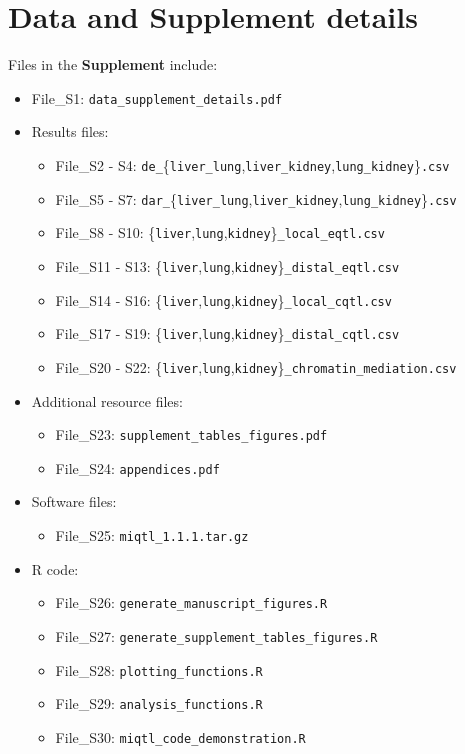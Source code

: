 \documentclass[10pt,letterpaper,twoside]{article}
\begin{document}
\section*{Data and Supplement details}

Files  in the \textbf{Supplement} include:

\begin{itemize}
	\item File\_S1: \texttt{data\_supplement\_details.pdf}
	\item Results files:
	\begin{itemize}
		\item File\_S2 - S4: \texttt{de\_}\{\texttt{liver\_lung},\texttt{liver\_kidney},\texttt{lung\_kidney}\}\texttt{.csv}
		\item File\_S5 - S7: \texttt{dar\_}\{\texttt{liver\_lung},\texttt{liver\_kidney},\texttt{lung\_kidney}\}\texttt{.csv}
		\item File\_S8 - S10: \{\texttt{liver},\texttt{lung},\texttt{kidney}\}\texttt{\_local\_eqtl.csv}
		\item File\_S11 - S13: \{\texttt{liver},\texttt{lung},\texttt{kidney}\}\texttt{\_distal\_eqtl.csv}
		\item File\_S14 - S16: \{\texttt{liver},\texttt{lung},\texttt{kidney}\}\texttt{\_local\_cqtl.csv}
		\item File\_S17 - S19: \{\texttt{liver},\texttt{lung},\texttt{kidney}\}\texttt{\_distal\_cqtl.csv}
		\item File\_S20 - S22: \{\texttt{liver},\texttt{lung},\texttt{kidney}\}\texttt{\_chromatin\_mediation.csv}
	\end{itemize}
	\item Additional resource files:
	\begin{itemize}
		\item File\_S23: \texttt{supplement\_tables\_figures.pdf}
		\item File\_S24: \texttt{appendices.pdf}
	\end{itemize}
		\item Software files:
	\begin{itemize}
		\item File\_S25: \texttt{miqtl\_1.1.1.tar.gz}
	\end{itemize}
	\item R code:
	\begin{itemize}
		\item File\_S26: \texttt{generate\_manuscript\_figures.R}
		\item File\_S27: \texttt{generate\_supplement\_tables\_figures.R}
		\item File\_S28: \texttt{plotting\_functions.R}
		\item File\_S29: \texttt{analysis\_functions.R}
		\item File\_S30: \texttt{miqtl\_code\_demonstration.R}
	\end{itemize}
\end{itemize}
\end{document}
